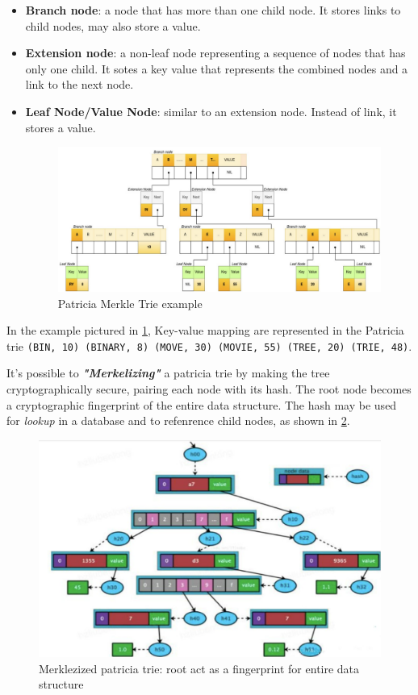 \documentclass[10pt,a4paper]{report}
\begin{document}
\begin{itemize}
	\item 
	\textbf{Branch node}: a node that has more than one child node. It stores links to child nodes, may also store a value.
	\item 
	\textbf{Extension node}: a non-leaf node representing a sequence of nodes that has only one child. It sotes a key value that represents the combined nodes and a link to the next node.
	\item 
	\textbf{Leaf Node/Value Node}: similar to an extension node. Instead of link, it stores a value.
	\begin{figure}
		\includegraphics[scale=0.35]{images/Pasted image 20230317173027.png}
		\caption{Patricia Merkle Trie example}
		\label{pamerkle-trie}	
	\end{figure}
	
\end{itemize}

In the example pictured in \ref{pamerkle-trie}, Key-value mapping are represented in the Patricia trie \texttt{(BIN, 10) (BINARY, 8) (MOVE, 30) (MOVIE, 55) (TREE, 20) (TRIE, 48)}.


It's possible to \textit{\textbf{"Merkelizing"}} a patricia trie by making the tree cryptographically secure, pairing each node with its hash. The root node becomes a cryptographic fingerprint of the entire data structure. The hash may be used for \textit{lookup} in a database and to refenrence child nodes, as shown in \ref{example3}.
\begin{figure}
	\includegraphics[scale=0.40]{images/Pasted image 20230317173304.png}
	\caption{Merklezized patricia trie: root act as a fingerprint for entire data structure}
	\label{example3}
\end{figure}
\end{document}
